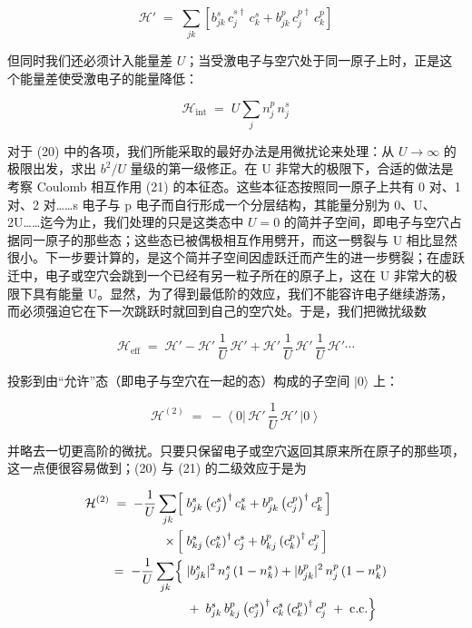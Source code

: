 \begin{equation*}
\mathcal{H}' \;=\; \sum_{jk}\left[b_{jk}^{s}\,c_j^{s\dagger}\,c_k^{s} + b_{jk}^{p}\,c_j^{p\dagger}\,c_k^{p}\right] \tag{20}
\end{equation*}

但同时我们还必须计入能量差 $U$；当受激电子与空穴处于同一原子上时，正是这个能量差使受激电子的能量降低：

\begin{equation*}
\mathcal{H}_{\mathrm{int}} \;=\; U\sum_j n_j^{p}\,n_j^{s} \tag{21}
\end{equation*}

对于 (20) 中的各项，我们所能采取的最好办法是用微扰论来处理：从 $U\to\infty$ 的极限出发，求出 $b^{2}/U$ 量级的第一级修正。在 U 非常大的极限下，合适的做法是考察 Coulomb 相互作用 (21) 的本征态。这些本征态按照同一原子上共有 0 对、1 对、2 对……s 电子与 p 电子而自行形成一个分层结构，其能量分别为 0、U、2U……迄今为止，我们处理的只是这类态中 $U = 0$ 的简并子空间，即电子与空穴占据同一原子的那些态；这些态已被偶极相互作用劈开，而这一劈裂与 U 相比显然很小。下一步要计算的，是这个简并子空间因虚跃迁而产生的进一步劈裂；在虚跃迁中，电子或空穴会跳到一个已经有另一粒子所在的原子上，这在 U 非常大的极限下具有能量 U。显然，为了得到最低阶的效应，我们不能容许电子继续游荡，而必须强迫它在下一次跳跃时就回到自己的空穴处。于是，我们把微扰级数

\begin{equation*}
\mathcal{H}_{\mathrm{eff}} \;=\; \mathcal{H}' - \mathcal{H}'\,\frac{1}{U}\,\mathcal{H}' + \mathcal{H}'\,\frac{1}{U}\,\mathcal{H}'\,\frac{1}{U}\,\mathcal{H}' \cdots
\end{equation*}

投影到由“允许”态（即电子与空穴在一起的态）构成的子空间 $|0\rangle$ 上：

\begin{equation*}
\mathcal{H}^{(2)} \;=\; -\left\langle 0\right|\,\mathcal{H}'\,\frac{1}{U}\,\mathcal{H}'\,\left|0\right\rangle
\end{equation*}

并略去一切更高阶的微扰。只要只保留电子或空穴返回其原来所在原子的那些项，这一点便很容易做到；(20) 与 (21) 的二级效应于是为

\begin{align*}
\mathcal{H}^{(2)} \;=\; -\frac{1}{U}\sum_{jk}\Bigl[\; & b_{jk}^{s}\left(c_j^{s}\right)^{\dagger}c_k^{s} + b_{jk}^{p}\left(c_j^{p}\right)^{\dagger}c_k^{p}\,\Bigr] \\
\times\,\Bigl[\; & b_{kj}^{s}\left(c_k^{s}\right)^{\dagger}c_j^{s} + b_{kj}^{p}\left(c_k^{p}\right)^{\dagger}c_j^{p}\,\Bigr] \\
=\; -\frac{1}{U}\sum_{jk}\Bigl\{\; & |b_{jk}^{s}|^{2}\,n_j^{s}\left(1 - n_k^{s}\right) + |b_{jk}^{p}|^{2}\,n_j^{p}\left(1 - n_k^{p}\right) \\
& +\; b_{jk}^{s}\,b_{kj}^{p}\left(c_j^{s}\right)^{\dagger}c_k^{s}\left(c_k^{p}\right)^{\dagger}c_j^{p} \;+\; \mathrm{c.c.}\Bigr\}
\end{align*}

